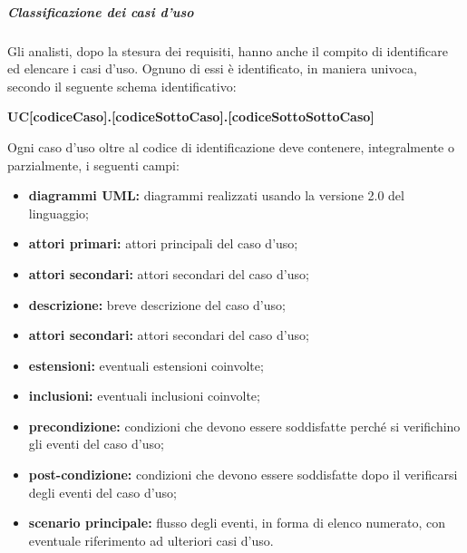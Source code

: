 				\subparagraph{Classificazione dei casi d'uso}
					Gli analisti, dopo la stesura dei requisiti, hanno anche il compito di identificare ed elencare i casi d'uso. Ognuno di essi è identificato, in maniera univoca, secondo il seguente schema identificativo:
					\begin{center}
						\textbf{UC[codiceCaso].[codiceSottoCaso].[codiceSottoSottoCaso]}
					\end{center}
					Ogni caso d'uso oltre al codice di identificazione deve contenere, integralmente o parzialmente, i seguenti campi:
					\begin{itemize}
						\item \textbf{diagrammi UML:} diagrammi realizzati usando la versione 2.0 del linguaggio;
						\item \textbf{attori primari:} attori principali del caso d'uso;
						\item \textbf{attori secondari:} attori secondari del caso d'uso;
						\item \textbf{descrizione:} breve descrizione del caso d'uso;
						\item \textbf{attori secondari:} attori secondari del caso d'uso;
						\item \textbf{estensioni:} eventuali estensioni coinvolte;
						\item \textbf{inclusioni:} eventuali inclusioni coinvolte;
						\item \textbf{precondizione:} condizioni che devono essere soddisfatte perché si verifichino gli eventi del caso d'uso;
						\item \textbf{post-condizione:} condizioni che devono essere soddisfatte dopo il verificarsi degli eventi del caso d'uso;
						\item \textbf{scenario principale:} flusso degli eventi, in forma di elenco numerato, con eventuale riferimento ad ulteriori casi d'uso.
					\end{itemize}

